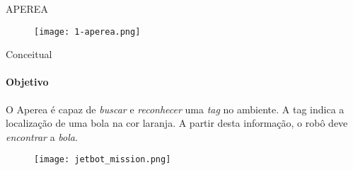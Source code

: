  \begin{frame}[c]{APEREA}
    \begin{figure}
        \texttt{[image: 1-aperea.png]}
    \end{figure}
\end{frame}

\begin{frame}[t]{Conceitual}
    \framesubtitle{Objetivo}
    
    O Aperea é capaz de \emph{buscar} e \emph{reconhecer} uma \emph{tag} no ambiente. A tag indica a localização de uma bola na cor laranja. A partir desta informação, o robô deve \emph{encontrar} a \emph{bola}.

    \vspace*{0.8cm}
    \begin{figure}
        \texttt{[image: jetbot\_mission.png]}
    \end{figure}
\end{frame}

